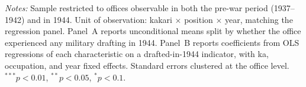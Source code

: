 \begin{table}[H]
\begin{threeparttable}
\begin{tablenotes}[flushleft]
\footnotesize
\item \textit{Notes:} Sample restricted to offices observable in both the pre-war period (1937--1942) and in 1944. Unit of observation: kakari $\times$ position $\times$ year, matching the regression panel. Panel~A reports unconditional means split by whether the office experienced any military drafting in 1944. Panel~B reports coefficients from OLS regressions of each characteristic on a drafted-in-1944 indicator, with ka, occupation, and year fixed effects. Standard errors clustered at the office level. $^{***}p<0.01$, $^{**}p<0.05$, $^{*}p<0.1$.
\end{tablenotes}
\end{threeparttable}
\end{table}
